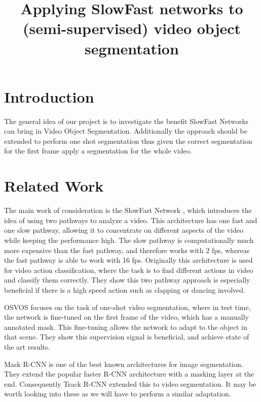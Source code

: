 \documentclass[conference]{IEEEtran}
\begin{document}
\title{Applying SlowFast networks to (semi-supervised) video object segmentation\\
}

\author{
\and
{}
}
\maketitle

\section{Introduction}
The general idea of our project is to investigate the benefit SlowFast Networks \cite{slow_fast} can bring in Video Object Segmentation. Additionally the approach should be extended to perform one shot segmentation thus given the correct segmentation for the first frame apply a segmentation for the whole video. 

\section{Related Work}
The main work of consideration is the SlowFast Network \cite{slow_fast}, which introduces the idea of using two pathways to analyze a video. This architecture has one fast and one slow pathway, allowing it to concentrate on different aspects of the video while keeping the performance high. The slow pathway is computationally much more expensive than the fast pathway, and therefore works with 2 fps, whereas the fast pathway is able to work with 16 fps. Originally this architecture is used for video action classification, where the task is to find different actions in video and classify them correctly. They show this two pathway approach is especially beneficial if there is a high speed action such as clapping or dancing involved.  

OSVOS \cite{osvos} focuses on the task of one-shot video segmentation, where in test time, the network is fine-tuned on the first frame of the video, which has a manually annotated mask. This fine-tuning allows the network to adapt to the object in that scene. They show this supervision signal is beneficial, and achieve state of the art results.


Mask R-CNN \cite{mask_rcnn} is one of the best known architectures for image segmentation. They extend the popular faster R-CNN architecture with a masking layer at the end. Consequently Track R-CNN \cite{track_rcnn} extended this to video segmentation. It may be worth looking into these as we will have to perform a similar adaptation.
\end{document}
